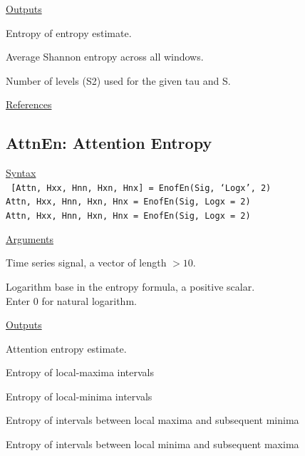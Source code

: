 \documentclass[12pt, a4paper, titlepage, openany]{book}
\begin{document}
\noindent \ul{Outputs}
\begin{description}[labelsep=1cm, labelwidth=2cm, nosep, style=multiline,leftmargin=3cm]\footnotesize
\item[\texttt{EoE}]	Entropy of entropy estimate.
\item[\texttt{AvEn}]	Average Shannon entropy across all windows.
\item[\texttt{S2}]	Number of levels (S2) used for the given tau and S.
\end{description}

\noindent \ul{References}\hspace{1cm}
\cite{EoE1}



\newpage
\subsection{\normalsize AttnEn: \hspace{15mm} Attention Entropy} \label{AttnEn}
\noindent\ul{Syntax} \vspace{6mm} \\ \noindent \texttt{\footnotesize
[Attn, Hxx, Hnn, Hxn, Hnx]  = EnofEn(Sig, ‘Logx’, 2) \\
Attn, Hxx, Hnn, Hxn, Hnx = EnofEn(Sig, Logx = 2) \\
Attn, Hxx, Hnn, Hxn, Hnx = EnofEn(Sig, Logx = 2)}

\noindent \ul{Arguments}
\begin{description}[labelsep=1cm, labelwidth=2cm, nosep, style=multiline,leftmargin=3cm]\footnotesize
\item[\texttt{Sig}]		Time series signal, a vector of length $> 10$.
\item[\texttt{Logx}]	Logarithm base in the entropy formula, a positive scalar.\\
		Enter 0 for natural logarithm.
\end{description}

\noindent \ul{Outputs}
\begin{description}[labelsep=1cm, labelwidth=2cm, nosep, style=multiline,leftmargin=3cm]\footnotesize
\item[\texttt{Attn}]	Attention entropy estimate.
\item[\texttt{Hxx}]	    Entropy of local-maxima intervals
\item[\texttt{Hnn}]	    Entropy of local-minima intervals
\item[\texttt{Hxn}]	    Entropy of intervals between local maxima and subsequent minima
\item[\texttt{Hnx}]	    Entropy of intervals between local minima and subsequent maxima  
\end{description}
\end{document}

